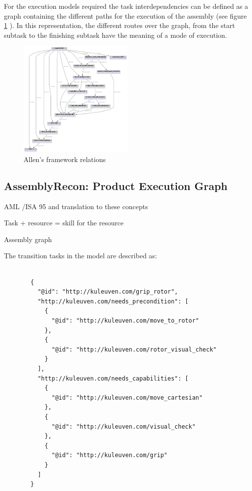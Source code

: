 \documentclass[a4paper,10pt]{article}
\begin{document}
For the execution models required the task interdependencies can be defined as a graph containing the different paths for the execution of the assembly (see figure \ref{fig:assembly_dag} ). In this representation, the different routes over the graph, from the start subtask to the finishing subtask have the meaning of a mode of execution.

\begin{figure}[h]
	\centering
	\includegraphics[width=0.5\textwidth]{snapfit_dag.png}
	\caption{Allen's framework relations}
	\label{fig:assembly_dag}
\end{figure}


\subsection{AssemblyRecon: Product Execution Graph}

AML /ISA 95 and translation to these concepts

Task + resource = skill for the resource

Assembly graph 

The transition tasks in the model are described as:

\begin{figure}
\begin{lstlisting}

  {
    "@id": "http://kuleuven.com/grip_rotor",
    "http://kuleuven.com/needs_precondition": [
      {
        "@id": "http://kuleuven.com/move_to_rotor"
      },
      {
        "@id": "http://kuleuven.com/rotor_visual_check"
      }
    ],
    "http://kuleuven.com/needs_capabilities": [
      {
        "@id": "http://kuleuven.com/move_cartesian"
      },
      {
        "@id": "http://kuleuven.com/visual_check"
      },
      {
        "@id": "http://kuleuven.com/grip"
      }
    ]
  }
\end{lstlisting}
	\label{fig:assembly_recon_task}
\end{figure}
\end{document}
